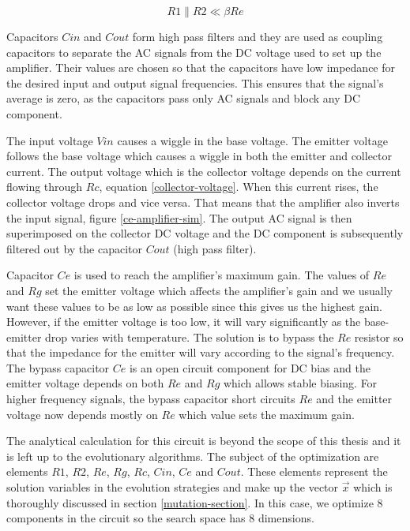 \begin{equation} \label{divider-impedance}
    R1 \| R2 \ll \beta Re
\end{equation}

Capacitors $Cin$ and $Cout$ form high pass filters and they are used as coupling capacitors to separate the AC signals from the DC voltage used to set up the amplifier. Their values are chosen so that the capacitors have low impedance for the desired input and output signal frequencies. This ensures that the signal's average is zero, as the capacitors pass only AC signals and block any DC component.

The input voltage $Vin$ causes a wiggle in the base voltage. The emitter voltage follows the base voltage which causes a wiggle in both the emitter and collector current. The output voltage which is the collector voltage depends on the current flowing through $Rc$, equation \ref{collector-voltage}. When this current rises, the collector voltage drops and vice versa. That means that the amplifier also inverts the input signal, figure \ref{ce-amplifier-sim}. The output AC signal is then superimposed on the collector DC voltage and the DC component is subsequently filtered out by the capacitor $Cout$ (high pass filter).

Capacitor $Ce$ is used to reach the amplifier's maximum gain. The values of $Re$ and $Rg$ set the emitter voltage which affects the amplifier's gain and we usually want these values to be as low as possible since this gives us the highest gain. However, if the emitter voltage is too low, it will vary significantly as the base-emitter drop varies with temperature. The solution is to bypass the $Re$ resistor so that the impedance for the emitter will vary according to the signal's frequency. The bypass capacitor $Ce$ is an open circuit component for DC bias and the emitter voltage depends on both $Re$ and $Rg$ which allows stable biasing. For higher frequency signals, the bypass capacitor short circuits $Re$ and the emitter voltage now depends mostly on $Re$ which value sets the maximum gain.

The analytical calculation for this circuit is beyond the scope of this thesis and it is left up to the evolutionary algorithms. The subject of the optimization are elements $R1$, $R2$, $Re$, $Rg$, $Rc$, $Cin$, $Ce$ and $Cout$. These elements represent the solution variables in the evolution strategies and make up the vector $\vec{x}$ which is thoroughly discussed in section \ref{mutation-section}. In this case, we optimize 8 components in the circuit so the search space has 8 dimensions.

